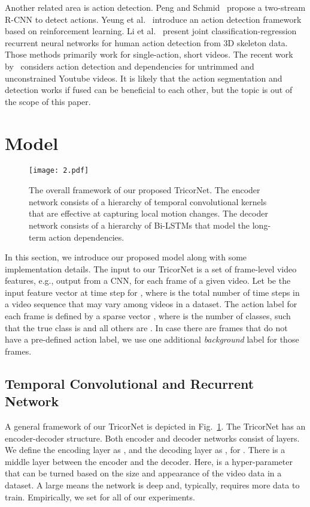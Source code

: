 \documentclass{article}
\begin{document}
Another related area is action detection. Peng and Schmid~\cite{PeScECCV2016} propose a two-stream R-CNN to detect actions. Yeung et al.~\cite{YeRuMoCVPR2016} introduce an action detection framework based on reinforcement learning. Li et al.~\cite{LiLaXiECCV2016} present joint classification-regression recurrent neural networks for human action detection from 3D skeleton data. Those methods primarily work for single-action, short videos. The recent work by~\cite{ZhXuCoARXIV2017} considers action detection and dependencies for untrimmed and unconstrained Youtube videos. It is likely that the action segmentation and detection works if fused can be beneficial to each other, but the topic is out of the scope of this paper.

\section{Model}
\label{sec:model}

\begin{figure}[t]
\centering
\texttt{[image: 2.pdf]}
\caption{The overall framework of our proposed TricorNet. The encoder network consists of a hierarchy of temporal convolutional kernels that are effective at capturing local motion changes. The decoder network consists of a hierarchy of Bi-LSTMs that model the long-term action dependencies.}
\label{f2}
\end{figure}

In this section, we introduce our proposed model along with some implementation details. The input to our TricorNet is a set of frame-level video features, e.g., output from a CNN, for each frame of a given video. Let  be the input feature vector at time step  for , where  is the total number of time steps in a video sequence that may vary among videos in a dataset. The action label for each frame is defined by a sparse vector  , where  is the number of classes, such that the true class is  and all others are . In case there are frames that do not have a pre-defined action label, we use one additional \textit{background} label for those frames.

\subsection{Temporal Convolutional and Recurrent Network}

A general framework of our TricorNet is depicted in Fig.~\ref{f2}. The TricorNet has an encoder-decoder structure. Both encoder and decoder networks consist of  layers. We define the encoding layer as , and the decoding layer as , for . There is a middle layer  between the encoder and the decoder. Here,  is a hyper-parameter that can be turned based on the size and appearance of the video data in a dataset. A large  means the network is deep and, typically, requires more data to train. Empirically, we set  for all of our experiments. 
\end{document}
